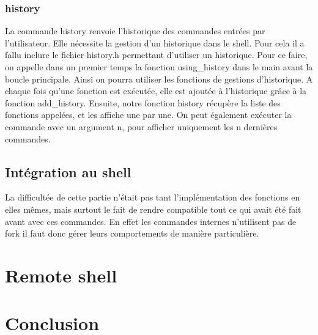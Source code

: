 \documentclass[12pt]{article}
\begin{document}
 \subsubsection{history}
 La commande history renvoie l'historique des commandes entrées par l'utilisateur. Elle nécessite la gestion d'un historique dans le shell. Pour cela il a fallu inclure le fichier history.h permettant d'utiliser un historique. Pour ce faire, on appelle dans un premier temps la fonction using\_history dans le main avant la boucle principale. Ainsi on pourra utiliser les fonctions de gestions d'historique. A chaque fois qu'une fonction est exécutée, elle est ajoutée à l'historique grâce à la fonction add\_history. Ensuite, notre fonction history récupère la liste des fonctions appelées, et les affiche une par une. On peut également exécuter la commande avec un argument n, pour afficher uniquement les n dernières commandes.
 
 \subsection{Intégration au shell}
 
 La difficultée de cette partie n'était pas tant l'implémentation des fonctions en elles mêmes,
 mais surtout le fait de rendre compatible tout ce qui avait été fait avant avec ces commandes.
 En effet les commandes internes n'utilisent pas de fork il faut donc gérer leurs comportements
 de manière particulière.

\newpage
\section{Remote shell}


\newpage
\section{Conclusion}
\end{document}
